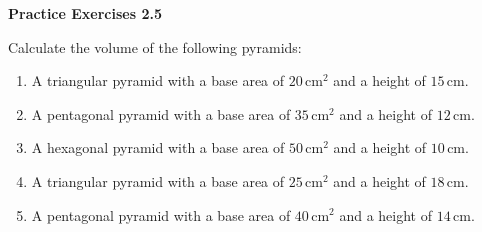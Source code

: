   \vspace{1ex}
\noindent\textbf{Practice Exercises 2.5}

\vspace{0.75ex}


Calculate the volume of the following pyramids:
\begin{enumerate}[noitemsep, label = \color{blue}\arabic*. ]

    \item A triangular pyramid with a base area of \(20 \, \text{cm}^2\) and a height of \(15 \, \text{cm}\).
    \item A pentagonal pyramid with a base area of \(35 \, \text{cm}^2\) and a height of \(12 \, \text{cm}\).
    \item A hexagonal pyramid with a base area of \(50 \, \text{cm}^2\) and a height of \(10 \, \text{cm}\).
    \item A triangular pyramid with a base area of \(25 \, \text{cm}^2\) and a height of \(18 \, \text{cm}\).
    \item A pentagonal pyramid with a base area of \(40 \, \text{cm}^2\) and a height of \(14 \, \text{cm}\).
\end{enumerate}


				
				
